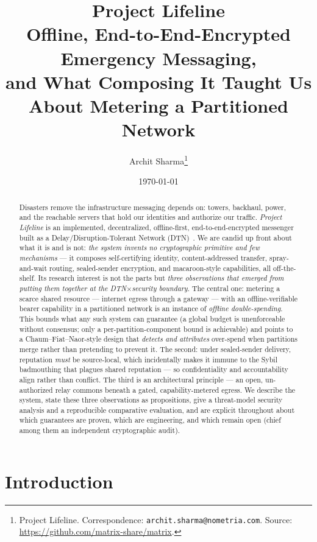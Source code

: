 \documentclass[11pt]{article}
\title{\textbf{Project Lifeline}\\[3pt]
\large Offline, End-to-End-Encrypted Emergency Messaging,\\
and What Composing It Taught Us About Metering a Partitioned Network}
\author{Archit Sharma\thanks{Project Lifeline. Correspondence: \texttt{archit.sharma@nometria.com}.
Source: \url{https://github.com/matrix-share/matrix}.}}
\date{\today}
\begin{document}
\maketitle

\begin{abstract}
Disasters remove the infrastructure messaging depends on: towers, backhaul,
power, and the reachable servers that hold our identities and authorize our
traffic. \emph{Project Lifeline} is an implemented, decentralized, offline-first,
end-to-end-encrypted messenger built as a Delay/Disruption-Tolerant Network
(DTN)~\cite{rfc4838}. We are candid up front about what it is and is not:
\emph{the system invents no cryptographic primitive and few mechanisms} --- it
composes self-certifying identity, content-addressed transfer, spray-and-wait
routing, sealed-sender encryption, and macaroon-style capabilities, all
off-the-shelf. Its research interest is not the parts but \emph{three
observations that emerged from putting them together at the DTN$\times$security
boundary}. The central one: metering a scarce shared resource --- internet egress
through a gateway --- with an offline-verifiable bearer capability in a
partitioned network is an instance of \emph{offline double-spending}. This bounds
what any such system can guarantee (a global budget is unenforceable without
consensus; only a per-partition-component bound is achievable) and points to a
Chaum--Fiat--Naor-style design that \emph{detects and attributes} over-spend when
partitions merge rather than pretending to prevent it. The second: under
sealed-sender delivery, reputation \emph{must} be source-local, which
incidentally makes it immune to the Sybil badmouthing that plagues shared
reputation --- so confidentiality and accountability align rather than conflict.
The third is an architectural principle --- an open, un-authorized relay commons
beneath a gated, capability-metered egress. We describe the system, state these
three observations as propositions, give a threat-model security analysis and a
reproducible comparative evaluation, and are explicit throughout about which
guarantees are proven, which are engineering, and which remain open (chief among
them an independent cryptographic audit).
\end{abstract}

\tableofcontents

\section{Introduction}
\end{document}
